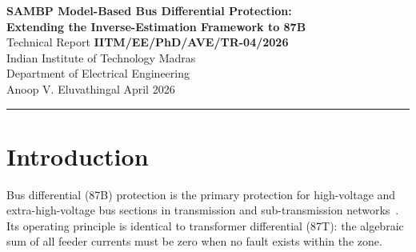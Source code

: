 \documentclass[12pt,a4paper]{article}
\newcommand{\kappan}{\kappa_n}
\newcommand{\thetaB}{\boldsymbol{\theta}_B}
\begin{document}

\begin{center}
  {\Large\bfseries
   SAMBP Model-Based Bus Differential Protection:\\[4pt]
   Extending the Inverse-Estimation Framework to 87B}\\[12pt]
  {\large Technical Report \textbf{IITM/EE/PhD/AVE/TR-04/2026}}\\[6pt]
  {\large Indian Institute of Technology Madras\\
   Department of Electrical Engineering}\\[6pt]
  {\normalsize Anoop V. Eluvathingal \quad\quad April 2026}\\[6pt]
  \rule{\textwidth}{0.8pt}
\end{center}

\begin{abstract}
This report extends the SAMBP (Signal-Adapted Model-Based Protection) framework
to bus differential (87B) protection.  A three-parameter zone model
$\thetaB = [I_{diff}, \varphi, \varepsilon_{CT}]$ is proposed, where the CT
mismatch/saturation factor $\varepsilon_{CT}$ is used to derive an internal-fault
indicator $f_{int} = \text{clip}(1 - \varepsilon_{CT}/\varepsilon_{thresh}, 0, 1)$
that is both identifiable and monotone.  The column-normalised condition number
satisfies $\kappan \leq 6.3$ across all scenarios, the lowest of any SAMBP function
to date.  A two-pass Levenberg-Marquardt estimator and a Stage-2 model-veto gate
are implemented and validated on six canonical events.  Five of six events are
correctly classified with zero assertion failures; CT open-circuit is documented
as an irreducible limitation requiring a high-impedance bus differential scheme.
\end{abstract}

\tableofcontents
\listoffigures
\listoftables

\section{Introduction}
\label{sec:intro}

Bus differential (87B) protection is the primary protection for high-voltage
and extra-high-voltage bus sections in transmission and sub-transmission
networks~\citep{Blackburn2006,IEC60255_87}.  Its operating principle is
identical to transformer differential (87T): the algebraic sum of all feeder
currents must be zero when no fault exists within the zone.
\end{document}
